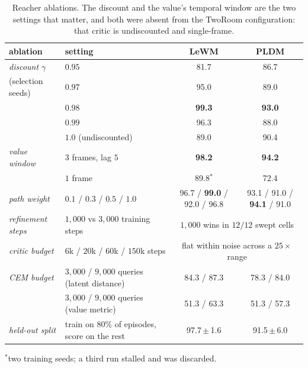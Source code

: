 \begin{table}[h]
\centering\small
\caption{Reacher ablations. The discount and the value's temporal window are
the two settings that matter, and both were absent from the TwoRoom
configuration: that critic is undiscounted and single-frame.}
\begin{tabular}{llcc}
\toprule
ablation & setting & LeWM & PLDM \\
\midrule
\emph{discount $\gamma$} & $0.95$ & 81.7 & 86.7 \\
(selection seeds)        & $0.97$ & 95.0 & 89.0 \\
                         & $\mathbf{0.98}$ & \textbf{99.3} & \textbf{93.0} \\
                         & $0.99$ & 96.3 & 88.0 \\
                         & $1.0$ (undiscounted) & 89.0 & 90.4 \\
\midrule
\emph{value window} & $3$ frames, lag $5$ & \textbf{98.2} & \textbf{94.2} \\
                    & $1$ frame & 89.8$^\ast$ & 72.4 \\
\midrule
\emph{path weight} & $0.1$ / $0.3$ / $0.5$ / $1.0$
 & 96.7 / \textbf{99.0} / 92.0 / 96.8
 & 93.1 / 91.0 / \textbf{94.1} / 91.0 \\
\midrule
\emph{refinement steps} & $1{,}000$ vs $3{,}000$ training steps
 & \multicolumn{2}{c}{$1{,}000$ wins in $12/12$ swept cells} \\
\midrule
\emph{critic budget} & $6$k / $20$k / $60$k / $150$k steps
 & \multicolumn{2}{c}{flat within noise across a $25\times$ range} \\
\midrule
\emph{CEM budget} & $3{,}000$ / $9{,}000$ queries (latent distance)
 & 84.3 / 87.3 & 78.3 / 84.0 \\
                  & $3{,}000$ / $9{,}000$ queries (value metric)
 & 51.3 / 63.3 & 51.3 / 57.3 \\
\midrule
\emph{held-out split} & train on $80\%$ of episodes, score on the rest
 & 97.7\,$\pm$\,1.6 & 91.5\,$\pm$\,6.0 \\
\bottomrule
\end{tabular}
\end{table}

\noindent$^\ast$two training seeds; a third run stalled and was discarded.

